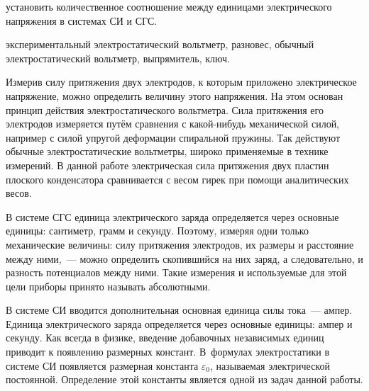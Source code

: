 \label{lab:absvolt}

\begin{lab:aim}
	установить количественное соотношение между единицами электрического
напряжения в системах СИ и СГС.
\end{lab:aim}

\begin{lab:equipment}
	экспериментальный электростатический вольтметр, разновес, обычный
электростатический вольтметр, выпрямитель, ключ.
\end{lab:equipment}

Измерив силу притяжения двух электродов, к которым приложено электрическое
напряжение, можно определить величину этого
напряжения. На этом основан принцип действия электростатического вольтметра.
Сила притяжения его электродов измеряется
путём сравнения с какой-нибудь механической силой, например с силой упругой
деформации спиральной пружины. Так действуют
обычные электростатические вольтметры, широко применяемые в технике измерений. В
данной работе электрическая сила
притяжения двух пластин плоского конденсатора сравнивается с весом гирек при
помощи аналитических весов.

В системе СГС единица электрического заряда определяется через основные единицы:
сантиметр, грамм и секунду. Поэтому, измеряя одни толь\-ко механические
величины: силу притяжения электродов, их размеры и расстояние между ними,~---
можно
определить скопившийся на них заряд, а следовательно, и разность потенциалов
между ними. Такие измерения и используемые
для этой цели приборы принято называть абсолютными.

В системе СИ вводится дополнительная основная единица силы тока~--- ампер.
Единица электрического заряда определяется
через основные единицы: ампер и секунду. Как всегда в физике, введение
добавочных независимых единиц приводит к
появлению размерных констант. В~формулах электростатики в системе СИ появляется
размерная константа $\varepsilon_0$, называемая
электрической постоянной. Определение этой константы является одной из задач
данной работы.

